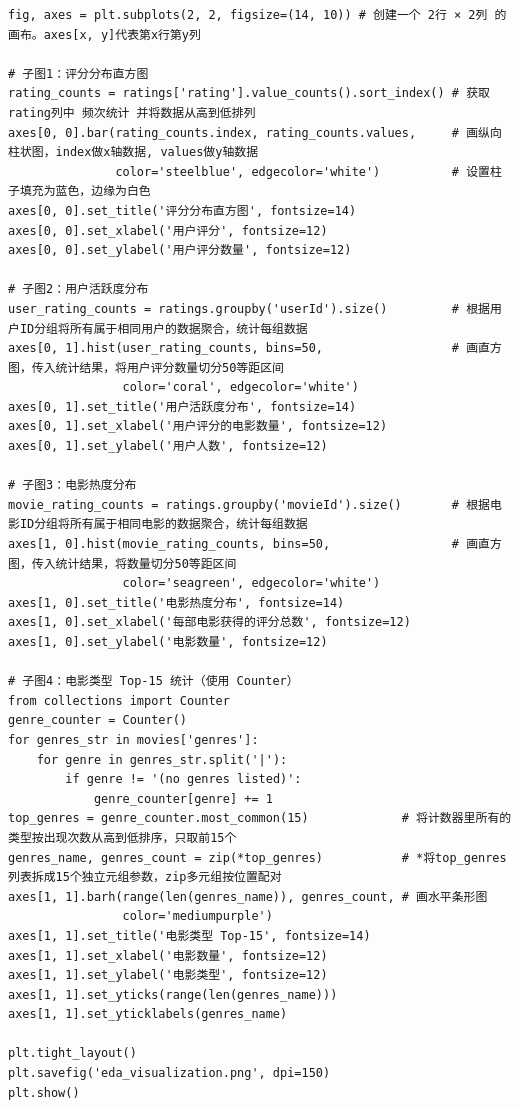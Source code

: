\documentclass[12pt,a4paper]{ctexart}
\begin{document}
\begin{lstlisting}[caption={评分分布与用户行为可视化}, label={lst:1-2}]
fig, axes = plt.subplots(2, 2, figsize=(14, 10)) # 创建一个 2行 × 2列 的画布。axes[x, y]代表第x行第y列

# 子图1：评分分布直方图
rating_counts = ratings['rating'].value_counts().sort_index() # 获取rating列中 频次统计 并将数据从高到低排列
axes[0, 0].bar(rating_counts.index, rating_counts.values,     # 画纵向柱状图，index做x轴数据, values做y轴数据
               color='steelblue', edgecolor='white')          # 设置柱子填充为蓝色，边缘为白色
axes[0, 0].set_title('评分分布直方图', fontsize=14)
axes[0, 0].set_xlabel('用户评分', fontsize=12)
axes[0, 0].set_ylabel('用户评分数量', fontsize=12)

# 子图2：用户活跃度分布
user_rating_counts = ratings.groupby('userId').size()         # 根据用户ID分组将所有属于相同用户的数据聚合，统计每组数据
axes[0, 1].hist(user_rating_counts, bins=50,                  # 画直方图，传入统计结果，将用户评分数量切分50等距区间
                color='coral', edgecolor='white')
axes[0, 1].set_title('用户活跃度分布', fontsize=14)
axes[0, 1].set_xlabel('用户评分的电影数量', fontsize=12)
axes[0, 1].set_ylabel('用户人数', fontsize=12)

# 子图3：电影热度分布
movie_rating_counts = ratings.groupby('movieId').size()       # 根据电影ID分组将所有属于相同电影的数据聚合，统计每组数据
axes[1, 0].hist(movie_rating_counts, bins=50,                 # 画直方图，传入统计结果，将数量切分50等距区间
                color='seagreen', edgecolor='white')
axes[1, 0].set_title('电影热度分布', fontsize=14)
axes[1, 0].set_xlabel('每部电影获得的评分总数', fontsize=12)
axes[1, 0].set_ylabel('电影数量', fontsize=12)

# 子图4：电影类型 Top-15 统计（使用 Counter）
from collections import Counter
genre_counter = Counter()
for genres_str in movies['genres']:
    for genre in genres_str.split('|'):
        if genre != '(no genres listed)':
            genre_counter[genre] += 1
top_genres = genre_counter.most_common(15)             # 将计数器里所有的类型按出现次数从高到低排序，只取前15个
genres_name, genres_count = zip(*top_genres)           # *将top_genres列表拆成15个独立元组参数，zip多元组按位置配对
axes[1, 1].barh(range(len(genres_name)), genres_count, # 画水平条形图
                color='mediumpurple')
axes[1, 1].set_title('电影类型 Top-15', fontsize=14)
axes[1, 1].set_xlabel('电影数量', fontsize=12)
axes[1, 1].set_ylabel('电影类型', fontsize=12)
axes[1, 1].set_yticks(range(len(genres_name)))  
axes[1, 1].set_yticklabels(genres_name)        

plt.tight_layout()
plt.savefig('eda_visualization.png', dpi=150)
plt.show()
\end{lstlisting}
\end{document}
